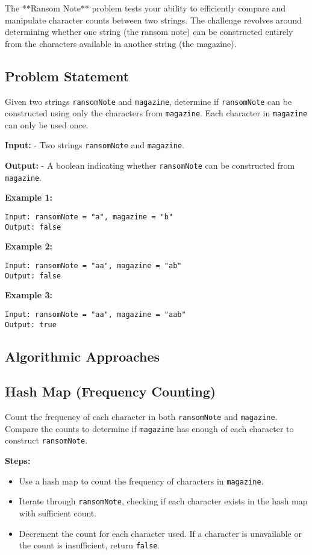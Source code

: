 
\label{problem:Ransom_Note}

The **Ransom Note** problem tests your ability to efficiently compare and manipulate character counts between two strings. The challenge revolves around determining whether one string (the ransom note) can be constructed entirely from the characters available in another string (the magazine). 

\subsection*{Problem Statement}
Given two strings \texttt{ransomNote} and \texttt{magazine}, determine if \texttt{ransomNote} can be constructed using only the characters from \texttt{magazine}. Each character in \texttt{magazine} can only be used once.

\textbf{Input:}
- Two strings \texttt{ransomNote} and \texttt{magazine}.

\textbf{Output:}
- A boolean indicating whether \texttt{ransomNote} can be constructed from \texttt{magazine}.

\textbf{Example 1:}
\begin{verbatim}
Input: ransomNote = "a", magazine = "b"
Output: false
\end{verbatim}

\textbf{Example 2:}
\begin{verbatim}
Input: ransomNote = "aa", magazine = "ab"
Output: false
\end{verbatim}

\textbf{Example 3:}
\begin{verbatim}
Input: ransomNote = "aa", magazine = "aab"
Output: true
\end{verbatim}

\subsection*{Algorithmic Approaches}

\subsection*{Hash Map (Frequency Counting)}
Count the frequency of each character in both \texttt{ransomNote} and \texttt{magazine}. Compare the counts to determine if \texttt{magazine} has enough of each character to construct \texttt{ransomNote}.

\textbf{Steps:}
\begin{itemize}
    \item Use a hash map to count the frequency of characters in \texttt{magazine}.
    \item Iterate through \texttt{ransomNote}, checking if each character exists in the hash map with sufficient count.
    \item Decrement the count for each character used. If a character is unavailable or the count is insufficient, return \texttt{false}.
\end{itemize}

